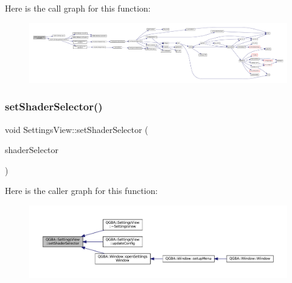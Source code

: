 Here is the call graph for this function\+:
\nopagebreak
\begin{figure}[H]
\begin{center}
\leavevmode
\includegraphics[width=350pt]{class_q_g_b_a_1_1_settings_view_a041bcef005f9f02600d2499f9dc04820_cgraph}
\end{center}
\end{figure}
\mbox{\label{class_q_g_b_a_1_1_settings_view_a251334e02b23d94ba1248c827ac62986}} 
\subsubsection{\texorpdfstring{set\+Shader\+Selector()}{setShaderSelector()}}
{\footnotesize\ttfamily void Settings\+View\+::set\+Shader\+Selector (\begin{DoxyParamCaption}\item[{Shader\+Selector $\ast$}]{shader\+Selector }\end{DoxyParamCaption})}

Here is the caller graph for this function\+:
\nopagebreak
\begin{figure}[H]
\begin{center}
\leavevmode
\includegraphics[width=350pt]{class_q_g_b_a_1_1_settings_view_a251334e02b23d94ba1248c827ac62986_icgraph}
\end{center}
\end{figure}
\mbox{\label{class_q_g_b_a_1_1_settings_view_a9290a71650ae7d397628f548b709e859}} 
